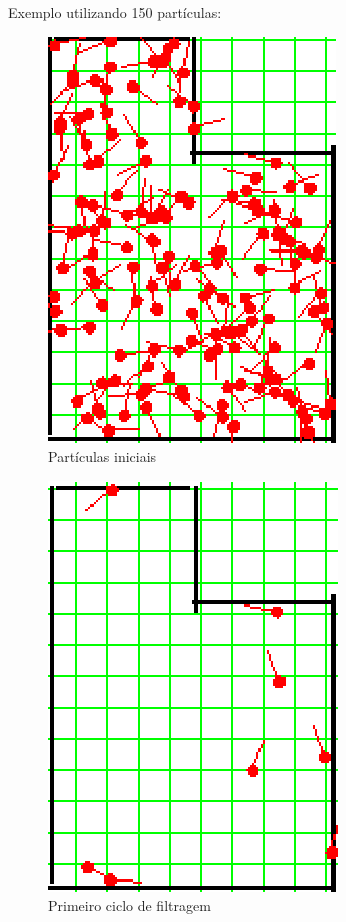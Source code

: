 Exemplo utilizando 150 partículas:

\begin{figure}[H]
  \centering
  \includegraphics[scale=0.6]{figuras/cen1_ex5/1.eps}
  \caption[Partículas Iniciais]{Partículas iniciais}
  \label{img:cen1_ex5_1}
\end{figure}

\begin{figure}[H]
  \centering
  \includegraphics[scale=0.6]{figuras/cen1_ex5/2.eps}
  \caption[Primeiro Ciclo de Filtragem]{Primeiro ciclo de filtragem}
  \label{img:cen1_ex5_2}
\end{figure}

